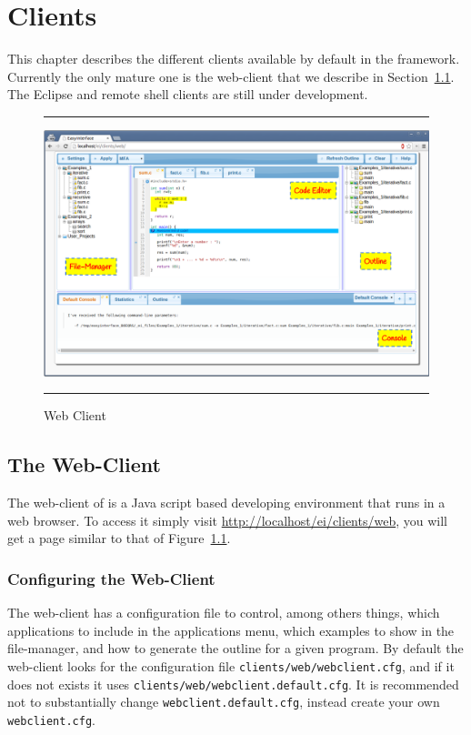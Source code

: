 {%
}

\chapter{\ei Clients}
\label{ch:clients}

This chapter describes the different clients available by default in
the \ei framework. Currently the only mature one is the web-client
that we describe in Section~\ref{ch:clients:web}. The Eclipse and
remote shell clients are still under development.

\begin{figure}[h]
\hrule\smallskip
\begin{center}
\includegraphics[width=1\textwidth]{fig/webclient.pdf}
\end{center}
\caption{\ei Web Client}
\label{fig:webclient}
\hrule
\end{figure}

\section{The Web-Client}
\label{ch:clients:web}

The web-client of \ei is a Java script based developing environment
that runs in a web browser. To access it simply visit
\url{http://localhost/ei/clients/web}, you will get a page similar to
that of Figure~\ref{fig:webclient}.

\subsection{Configuring the Web-Client}

The web-client has a configuration file to control, among others
things, which applications to include in the applications menu, which
examples to show in the file-manager, and how to generate the outline
for a given program.
%
By default the web-client looks for the configuration file
\texttt{clients/web/webclient.cfg}, and if it does not exists it uses
\texttt{clients/web/webclient.default.cfg}.
%
It is recommended not to substantially change
\texttt{webclient.default.cfg}, instead create your own
\texttt{webclient.cfg}. 

